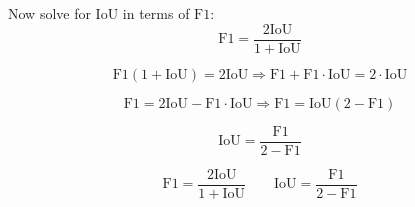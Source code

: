 \noindent
Now solve for \(\text{IoU}\) in terms of \(\text{F1}\):
\[
\text{F1} = \frac{2\text{IoU}}{1 + \text{IoU}}
\]
    
\[
\text{F1}(1 + \text{IoU}) = 2\text{IoU}
\Rightarrow \text{F1} + \text{F1} \cdot \text{IoU} = 2 \cdot \text{IoU}
\]
    
\[
\text{F1} = 2\text{IoU} - \text{F1} \cdot \text{IoU}
\Rightarrow \text{F1} = \text{IoU}(2 - \text{F1})
\]
    
\[
\text{IoU} = \frac{\text{F1}}{2 - \text{F1}}
\]
    
\begin{equation}
    \boxed{
    \text{F1} = \frac{2\text{IoU}}{1 + \text{IoU}} \qquad
    \text{IoU} = \frac{\text{F1}}{2 - \text{F1}}
    }
    \label{eq:conversion}
\end{equation}


